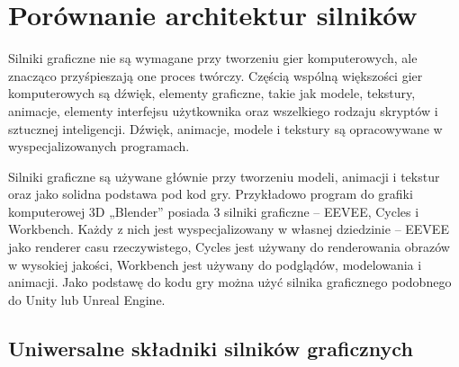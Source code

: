 \documentclass[12pt,twoside]{article}
\begin{document}
\section{Porównanie architektur silników}

Silniki graficzne nie są wymagane przy tworzeniu gier komputerowych, ale
znacząco przyśpieszają one proces twórczy. Częścią wspólną większości gier
komputerowych są dźwięk, elementy graficzne, takie jak modele, tekstury,
animacje, elementy interfejsu użytkownika oraz wszelkiego rodzaju skryptów i
sztucznej inteligencji. Dźwięk, animacje, modele i tekstury są opracowywane w
wyspecjalizowanych programach. 

Silniki graficzne są używane głównie przy tworzeniu modeli, animacji i tekstur
oraz jako solidna podstawa pod kod gry. Przykładowo program do grafiki
komputerowej 3D „Blender” posiada 3 silniki graficzne -- EEVEE\cite{Blender:EEVEE}, Cycles\cite{Blender:Cycles}
i Workbench\cite{Blender:Workbench}. Każdy z nich jest wyspecjalizowany w własnej dziedzinie – EEVEE
jako renderer casu rzeczywistego, Cycles jest używany do renderowania obrazów w
wysokiej jakości, Workbench jest używany do podglądów, modelowania i animacji.
Jako podstawę do kodu gry można użyć silnika graficznego podobnego do Unity lub
Unreal Engine. 


\subsection{Uniwersalne składniki silników graficznych}
\end{document}
